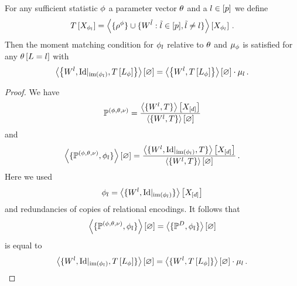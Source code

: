 \begin{lemma}\label{lem:mmContractionEquation}
	For any sufficient statistic $\phi$ a parameter vector $\theta$ and a $l\in[p]$ we define
	\begin{align*}
	 	T\left[X_{\phi_l}\right] 
		= \left\langle \{\rho^{\phi}\}\cup\{W^{\tilde{l}} : \tilde{l} \in [p], \tilde{l}\neq l\}\right\rangle \left[ X_{\phi_l} \right] \, . 
	\end{align*}
	Then the moment matching condition for $\phi_l$ relative to $\theta$ and $\mu_\phi$ is satisfied for any $\theta\left[L=l\right]$ with
	\begin{align*}
		\left\langle \left\{W^{l}, \mathrm{Id}|_{\mathrm{im}\left(\phi_l\right)}, T\left[L_\phi\right]\right\}\right\rangle \left[ \varnothing \right]
		= \left\langle \left\{W^{l}, T\left[L_\phi\right]\right\}\right\rangle \left[ \varnothing \right] \cdot \mu_l \, . 
	\end{align*}
\end{lemma}
\begin{proof}
	We have
	\begin{align*}
		\mathbb{P}^{(\phi,\theta,\nu)} = \frac{
			\left\langle \{W^{l}, T \}\right\rangle \left[ X_{[d]} \right]
		}{
			\left\langle \left\{W^{l}, T\right\}\right\rangle \left[ \varnothing \right]
		}
	\end{align*}
	and 
	\begin{align*}
		\left\langle \{\mathbb{P}^{(\phi,\theta,\nu)}, \phi_l\}\right\rangle \left[ \varnothing \right] 
		= \frac{
			\left\langle \{W^{l}, \mathrm{Id}|_{\mathrm{im}\left(\phi_l\right)}, T \}\right\rangle \left[ X_{[d]} \right]
		}{
			\left\langle \{W^{l}, T\}\right\rangle \left[ \varnothing \right]
		} \, . 
	\end{align*}
	Here we used
		\[ \phi_l = \left\langle \{W^{l}, \mathrm{Id}|_{\mathrm{im}\left(\phi_l\right)}\}\right\rangle \left[ X_{[d]} \right] \]
	and redundancies of copies of relational encodings.
	It follows that 
	\begin{align*}
		\left\langle \{\mathbb{P}^{(\phi,\theta,\nu)},\phi_l\}\right\rangle \left[ \varnothing \right] = \left\langle \{\mathbb{P}^{D},\phi_l\}\right\rangle \left[ \varnothing \right]
	\end{align*}
	is equal to
	\begin{align*}
		\left\langle \{W^{l}, \mathrm{Id}|_{\mathrm{im}\left(\phi_l\right)}, T\left[L_\phi\right]  \}\right\rangle \left[ \varnothing \right]
		= \left\langle \{W^{l}, T\left[L_\phi\right]  \}\right\rangle \left[ \varnothing \right] \cdot \mu_l \, . 
	\end{align*}	
\end{proof}

